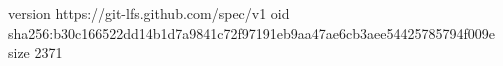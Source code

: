 version https://git-lfs.github.com/spec/v1
oid sha256:b30c166522dd14b1d7a9841c72f97191eb9aa47ae6cb3aee54425785794f009e
size 2371
